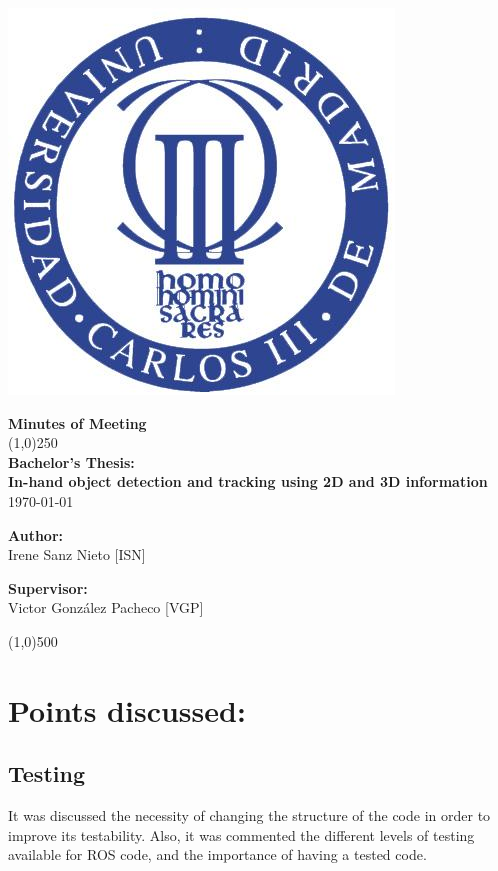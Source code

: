 \documentclass{article}
\newenvironment{myindentpar}[1]%
 {\begin{list}{}%
         {\setlength{\leftmargin}{#1}}%
         \item[]%
 }
 {\end{list}}
\begin{document}
\includegraphics[width=0.1\linewidth]{../template/uc3m.jpg}

\vspace{-1cm}
\begin{minipage}[b]{1\linewidth}
	\begin{center}
	{\Huge \bfseries{Minutes of Meeting}}\\
	\line(1,0){250}\\[0.5cm]
	{\LARGE \textbf{Bachelor's Thesis:\\[0.5cm] In-hand object detection and tracking using 2D and 3D information}}\\[0.5cm]
	{\large \today}
	\end{center}
\end {minipage}



\begin{minipage}{0.55\textwidth}
\begin{flushleft} \large
\textbf{{Author:}\\}
Irene Sanz Nieto [ISN]\\
\end{flushleft}
\end{minipage}
\begin{minipage}{0.4\textwidth}
\begin{flushright} \large
\textbf{Supervisor: }\\
Victor González Pacheco [VGP]
\end{flushright}\end{minipage}

\begin{center}
\line(1,0){500}
\end{center}

\renewcommand{\thesubsection}
{\hspace*{1cm} \arabic{section}.\arabic{subsection}}



\section{\LARGE Points discussed: }
	\subsection{Testing}
		\begin{myindentpar}{1cm} 
It was discussed the necessity of changing the structure of the code in order to improve its testability. Also, it was commented the different levels of testing available for ROS code, and the importance of having a tested code. 
		\end{myindentpar}
\end{document}
